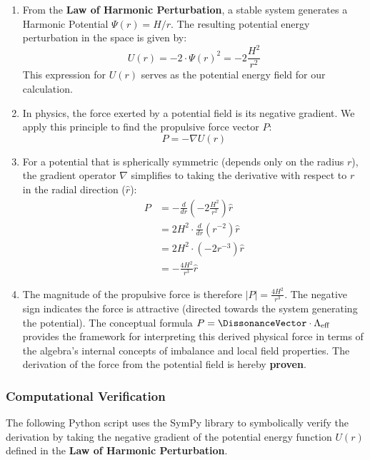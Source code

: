 \begin{enumerate}
    \item From the \textbf{Law of Harmonic Perturbation}, a stable system generates a Harmonic Potential $\Psi(r) = H/r$.  The resulting potential energy perturbation in the space is given by: 
    $$ U(r) = -2 \cdot \Psi(r)^2 = -2\frac{H^2}{r^2} $$
    This expression for $U(r)$ serves as the potential energy field for our calculation.

    \item In physics, the force exerted by a potential field is its negative gradient. We apply this principle to find the propulsive force vector $P$:
    $$ P = -\nabla U(r) $$

    \item For a potential that is spherically symmetric (depends only on the radius $r$), the gradient operator $\nabla$ simplifies to taking the derivative with respect to $r$ in the radial direction ($\hat{r}$):
    \begin{align*}
        P &= - \frac{d}{dr} \left( -2\frac{H^2}{r^2} \right) \hat{r} \\
          &= 2H^2 \cdot \frac{d}{dr} \left( r^{-2} \right) \hat{r} \\
          &= 2H^2 \cdot (-2r^{-3}) \hat{r} \\
          &= -\frac{4H^2}{r^3} \hat{r}
    \end{align*}
    
    \item The magnitude of the propulsive force is therefore $|P| = \frac{4H^2}{r^3}$. The negative sign indicates the force is attractive (directed towards the system generating the potential). The conceptual formula $P = \DissonanceVector \cdot \Lambda_{\text{eff}}$ provides the framework for interpreting this derived physical force in terms of the algebra's internal concepts of imbalance and local field properties. The derivation of the force from the potential field is hereby \textbf{proven}.
\end{enumerate}

\subsubsection*{Computational Verification}
The following Python script uses the SymPy library to symbolically verify the derivation by taking the negative gradient of the potential energy function $U(r)$ defined in the \textbf{Law of Harmonic Perturbation}.

